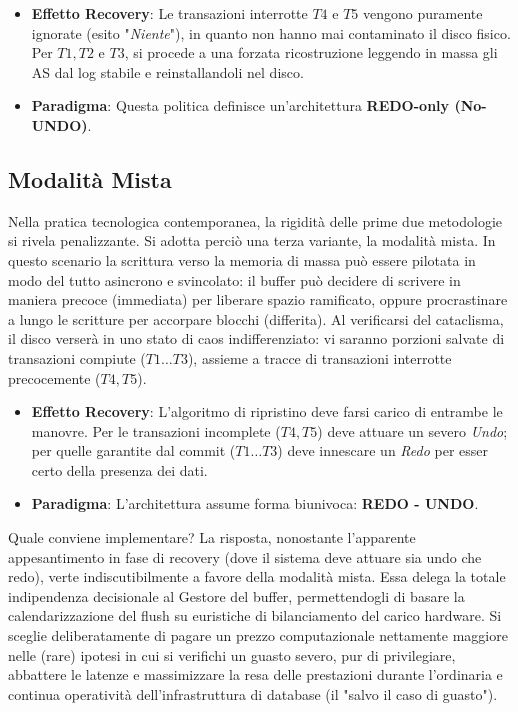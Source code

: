 \begin{itemize}
    \item \textbf{Effetto Recovery}: Le transazioni interrotte $T4$ e $T5$ vengono puramente ignorate (esito "\textit{Niente}"), in quanto non hanno mai contaminato il disco fisico. Per $T1, T2$ e $T3$, si procede a una forzata ricostruzione leggendo in massa gli AS dal log stabile e reinstallandoli nel disco.
    \item \textbf{Paradigma}: Questa politica definisce un'architettura \textbf{REDO-only (No-UNDO)}.
\end{itemize}

\subsection{Modalità Mista}
Nella pratica tecnologica contemporanea, la rigidità delle prime due metodologie si rivela penalizzante. Si adotta perciò una terza variante, la modalità mista. In questo scenario la scrittura verso la memoria di massa può essere pilotata in modo del tutto asincrono e svincolato: il buffer può decidere di scrivere in maniera precoce (immediata) per liberare spazio ramificato, oppure procrastinare a lungo le scritture per accorpare blocchi (differita). Al verificarsi del cataclisma, il disco verserà in uno stato di caos indifferenziato: vi saranno porzioni salvate di transazioni compiute ($T1 \dots T3$), assieme a tracce di transazioni interrotte precocemente ($T4, T5$).

\begin{itemize}
    \item \textbf{Effetto Recovery}: L'algoritmo di ripristino deve farsi carico di entrambe le manovre. Per le transazioni incomplete ($T4, T5$) deve attuare un severo \textit{Undo}; per quelle garantite dal commit ($T1 \dots T3$) deve innescare un \textit{Redo} per esser certo della presenza dei dati.
    \item \textbf{Paradigma}: L'architettura assume forma biunivoca: \textbf{REDO - UNDO}.
\end{itemize}

Quale conviene implementare? La risposta, nonostante l'apparente appesantimento in fase di recovery (dove il sistema deve attuare sia undo che redo), verte indiscutibilmente a favore della modalità mista. Essa delega la totale indipendenza decisionale al Gestore del buffer, permettendogli di basare la calendarizzazione del flush su euristiche di bilanciamento del carico hardware. Si sceglie deliberatamente di pagare un prezzo computazionale nettamente maggiore nelle (rare) ipotesi in cui si verifichi un guasto severo, pur di privilegiare, abbattere le latenze e massimizzare la resa delle prestazioni durante l'ordinaria e continua operatività dell'infrastruttura di database (il "salvo il caso di guasto").

